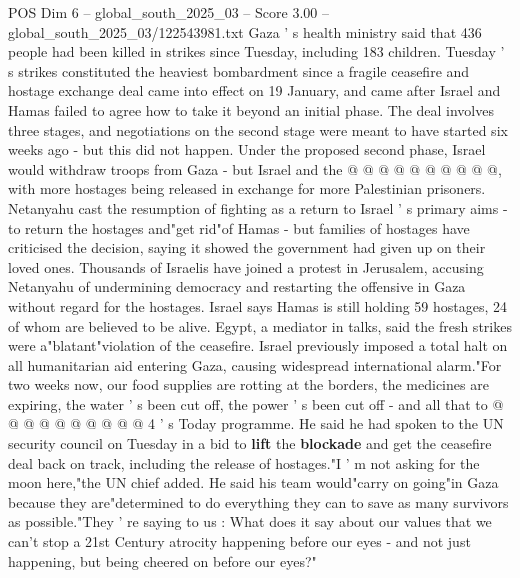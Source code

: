 \begin{textsample}{POS Dim 6 – global\_south\_2025\_03 – Score 3.00 – global\_south\_2025\_03/122543981.txt}
Gaza ' s health ministry said that 436 people had been killed in strikes since Tuesday, including 183 children.
Tuesday ' s strikes constituted the heaviest bombardment since a fragile ceasefire and hostage exchange deal came into effect on 19 January, and came after Israel and Hamas failed to agree how to take it beyond an initial phase.
The deal involves three stages, and negotiations on the second stage were meant to have started six weeks ago - but this did not happen.
Under the proposed second phase, Israel would withdraw troops from Gaza - but Israel and the @ @ @ @ @ @ @ @ @ @, with more hostages being released in exchange for more Palestinian prisoners.
Netanyahu cast the resumption of fighting as a return to Israel ' s primary aims - to return the hostages and"get rid"of Hamas - but families of hostages have criticised the decision, saying it showed the government had given up on their loved ones.
Thousands of Israelis have joined a protest in Jerusalem, accusing Netanyahu of undermining democracy and restarting the offensive in Gaza without regard for the hostages.
Israel says Hamas is still holding 59 hostages, 24 of whom are believed to be alive.
Egypt, a mediator in talks, said the fresh strikes were a"blatant"violation of the ceasefire.
Israel previously imposed a total halt on all humanitarian aid entering Gaza, causing widespread international alarm."For two weeks now, our food supplies are rotting at the borders, the medicines are expiring, the water ' s been cut off, the power ' s been cut off - and all that to @ @ @ @ @ @ @ @ @ @ 4 ' s Today programme.
He said he had spoken to the UN security council on Tuesday in a bid to \textbf{lift} the \textbf{blockade} and get the ceasefire deal back on track, including the release of hostages."I ' m not asking for the moon here,"the UN chief added.
He said his team would"carry on going"in Gaza because they are"determined to do everything they can to save as many survivors as possible."They ' re saying to us : What does it say about our values that we can't stop a 21st Century atrocity happening before our eyes - and not just happening, but being cheered on before our eyes?"

\end{textsample}
